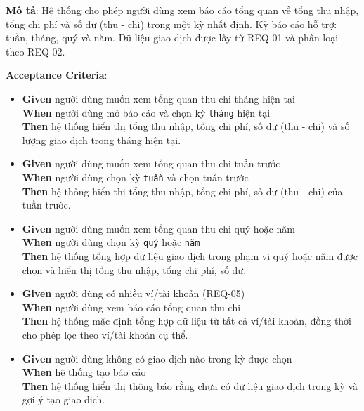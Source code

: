 \textbf{Mô tả}: Hệ thống cho phép người dùng xem báo cáo tổng quan về tổng thu nhập, tổng chi phí và số dư (thu - chi) trong một kỳ nhất định. Kỳ báo cáo hỗ trợ: tuần, tháng, quý và năm. Dữ liệu giao dịch được lấy từ REQ-01 và phân loại theo REQ-02.



\textbf{Acceptance Criteria}:

\begin{itemize}
\item \textbf{Given} người dùng muốn xem tổng quan thu chi tháng hiện tại  \\ \hspace*{1.5em}  \textbf{When} người dùng mở báo cáo và chọn kỳ \texttt{tháng} hiện tại  \\ \hspace*{1.5em}  \textbf{Then} hệ thống hiển thị tổng thu nhập, tổng chi phí, số dư (thu - chi) và số lượng giao dịch trong tháng hiện tại.
\item \textbf{Given} người dùng muốn xem tổng quan thu chi tuần trước  \\ \hspace*{1.5em}  \textbf{When} người dùng chọn kỳ \texttt{tuần} và chọn tuần trước  \\ \hspace*{1.5em}  \textbf{Then} hệ thống hiển thị tổng thu nhập, tổng chi phí, số dư (thu - chi) của tuần trước.
\item \textbf{Given} người dùng muốn xem tổng quan thu chi quý hoặc năm  \\ \hspace*{1.5em}  \textbf{When} người dùng chọn kỳ \texttt{quý} hoặc \texttt{năm}  \\ \hspace*{1.5em}  \textbf{Then} hệ thống tổng hợp dữ liệu giao dịch trong phạm vi quý hoặc năm được chọn và hiển thị tổng thu nhập, tổng chi phí, số dư.
\item \textbf{Given} người dùng có nhiều ví/tài khoản (REQ-05)  \\ \hspace*{1.5em}  \textbf{When} người dùng xem báo cáo tổng quan thu chi  \\ \hspace*{1.5em}  \textbf{Then} hệ thống mặc định tổng hợp dữ liệu từ tất cả ví/tài khoản, đồng thời cho phép lọc theo ví/tài khoản cụ thể.
\item \textbf{Given} người dùng không có giao dịch nào trong kỳ được chọn  \\ \hspace*{1.5em}  \textbf{When} hệ thống tạo báo cáo  \\ \hspace*{1.5em}  \textbf{Then} hệ thống hiển thị thông báo rằng chưa có dữ liệu giao dịch trong kỳ và gợi ý tạo giao dịch.

\end{itemize}
